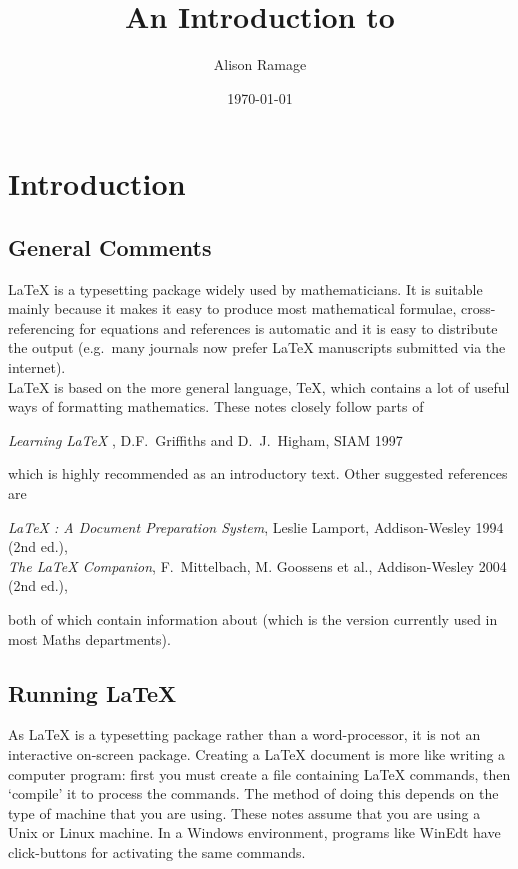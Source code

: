 \documentclass[11pt,a4]{article}
\title{An Introduction to \lx}
\author{Alison Ramage}
\date{\today}
\newcommand{\bc}{\begin{center}}
\newcommand{\ec}{\end{center}}
\newcommand{\lx}{{\LaTeX} }
\begin{document}
\maketitle

\section{\label{start}Introduction}
\subsection{General Comments}

\lx is a typesetting package widely used by mathematicians. It is
suitable mainly because it makes it easy to produce most
mathematical formulae, cross-referencing for equations and
references is automatic and it is easy to distribute the output
(e.g.\ many journals now prefer \lx manuscripts submitted via the
internet).\\

\lx is based on the more general language, \TeX, which contains a lot of
useful ways of formatting mathematics.
These notes closely follow parts of
\bc
\textit{Learning \lx},
D.F.\ Griffiths and D.\ J.\ Higham, SIAM 1997
\ec
which is highly recommended as an introductory text.
Other suggested references are
\bc
\textit{\lx: A Document Preparation System}, Leslie Lamport,
Addison-Wesley 1994 (2nd ed.),\\
\textit{The \lx Companion},
F.\ Mittelbach, M. Goossens et al., Addison-Wesley 2004 (2nd ed.),
\ec
both of which contain information about \LaTeXe (which is the
version currently used in most Maths departments). 

\subsection{Running \lx}
As \lx is a typesetting package rather than a word-processor, it
is not an interactive on-screen package. Creating a \lx document
is more like writing a computer program: first you must create a
file containing \lx commands, then `compile' it to process the commands.
The method of doing this depends on the type of machine 
that you are using. These notes assume that you are using a Unix or Linux 
machine. In a Windows environment, programs like WinEdt
have click-buttons for activating the same commands.\\
\end{document}
